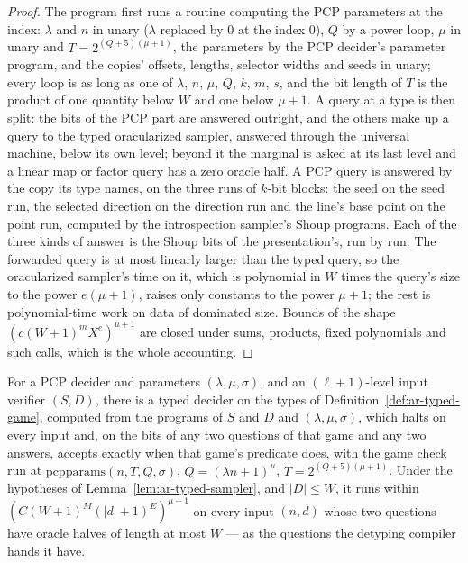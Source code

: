 \begin{proof}
\leanok
The program first runs a routine computing the PCP parameters at the index: $\lambda$ and $n$ in
unary ($\lambda$ replaced by $0$ at the index $0$), $Q$ by a power loop, $\mu$ in unary and
$T=2^{(Q+5)(\mu+1)}$, the parameters by the PCP decider's parameter program, and
the copies' offsets, lengths, selector widths and seeds in unary; every loop is as long as one of
$\lambda$, $n$, $\mu$, $Q$, $k$, $m$, $s$, and the bit length of $T$ is the product of one quantity
below $W$ and one below $\mu+1$. A query at a type is then split:
the bits of the PCP part are answered outright, and the others make up a query to the typed
oracularized sampler, answered through the universal machine, below its own level; beyond it the
marginal is asked at its last level and a linear map or factor query has a zero oracle half. A
PCP query is answered by the copy its type names, on the three runs of $k$-bit blocks: the seed on
the seed run, the selected direction on the direction run and the line's base point on the point
run, computed by the introspection sampler's Shoup programs. Each of the three kinds of answer is
the Shoup bits of the presentation's, run by run. The forwarded query is at most linearly larger
than the typed query, so the oracularized sampler's time on it, which is polynomial in $W$ times
the query's size to the power $e(\mu+1)$, raises only constants to the power $\mu+1$; the rest is
polynomial-time work on data of dominated size. Bounds of the shape $(c(W+1)^m X^e)^{\mu+1}$ are
closed under sums, products, fixed polynomials and such calls, which is the whole accounting.
\end{proof}

\begin{lemma}
\label{lem:ar-typed-decider}
\leanok
For a PCP decider and parameters $(\lambda,\mu,\sigma)$, and an $(\ell+1)$-level input verifier
$(S,D)$, there is a typed decider on the types of Definition~\ref{def:ar-typed-game}, computed
from the programs of $S$ and $D$ and $(\lambda,\mu,\sigma)$, which halts on every input and, on the
bits of any two questions of that game and any two answers, accepts exactly when that game's
predicate does, with the game check run at $\mathrm{pcpparams}(n,T,Q,\sigma)$,
$Q=(\lambda n+1)^\mu$, $T=2^{(Q+5)(\mu+1)}$. Under the hypotheses of
Lemma~\ref{lem:ar-typed-sampler}, and $|D|\le W$, it runs within
$(C(W+1)^M(|d|+1)^E)^{\mu+1}$ on every input $(n,d)$ whose two questions have oracle halves of
length at most $W$ --- as the questions the detyping compiler hands it have.
\end{lemma}

